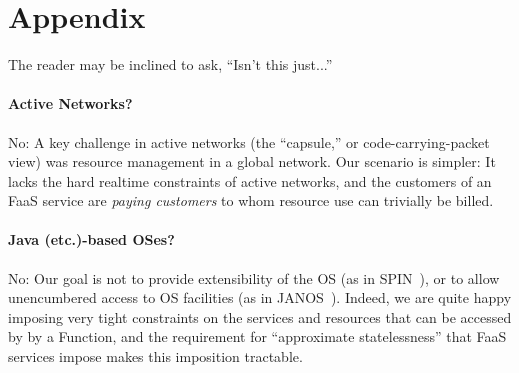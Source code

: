 \section*{Appendix}

The reader may be inclined to ask, ``Isn't this just...''

\paragraph{Active Networks?}  No:  A key challenge in active networks (the
``capsule,'' or code-carrying-packet view) was resource management in a
global network.  Our scenario is simpler:  It lacks the hard realtime
constraints of active networks, and the customers of an FaaS service are
\emph{paying customers} to whom resource use can trivially be billed.

\paragraph{Java (etc.)-based OSes?}  No:  Our goal is not to provide
extensibility of the OS (as in SPIN~\cite{Bershad+:sosp15}), or to allow unencumbered
access to OS facilities (as in JANOS~\cite{Tullmann2002}).  Indeed, we are quite happy
imposing very tight constraints on the services and resources that
can be accessed by by a Function, and the requirement for ``approximate
statelessness'' that FaaS services impose makes this imposition tractable.
